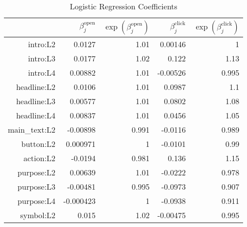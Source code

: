\begin{table}[ht]
\centering
\caption{Logistic Regression Coefficients} 
\label{tab:logit_results}
\begin{tabular}{rrrrr}
  \hline
 & $\beta_j^{\text{open}}$ & $\exp(\beta_j^{\text{open}})$ & $\beta_j^{\text{click}}$ & $\exp(\beta_j^{\text{click}})$ \\ 
  \hline
\textsf{intro:L2} & 0.0127 & 1.01 & 0.00146 &    1 \\ 
  \textsf{intro:L3} & 0.0177 & 1.02 & 0.122 & 1.13 \\ 
  \textsf{intro:L4} & 0.00882 & 1.01 & -0.00526 & 0.995 \\ 
  \textsf{headline:L2} & 0.0106 & 1.01 & 0.0987 &  1.1 \\ 
  \textsf{headline:L3} & 0.00577 & 1.01 & 0.0802 & 1.08 \\ 
  \textsf{headline:L4} & 0.00837 & 1.01 & 0.0456 & 1.05 \\ 
  \textsf{main\_text:L2} & -0.00898 & 0.991 & -0.0116 & 0.989 \\ 
  \textsf{button:L2} & 0.000971 &    1 & -0.0101 & 0.99 \\ 
  \textsf{action:L2} & -0.0194 & 0.981 & 0.136 & 1.15 \\ 
  \textsf{purpose:L2} & 0.00639 & 1.01 & -0.0222 & 0.978 \\ 
  \textsf{purpose:L3} & -0.00481 & 0.995 & -0.0973 & 0.907 \\ 
  \textsf{purpose:L4} & -0.000423 &    1 & -0.0938 & 0.911 \\ 
  \textsf{symbol:L2} & 0.015 & 1.02 & -0.00475 & 0.995 \\ 
   \hline
\end{tabular}
\end{table}
